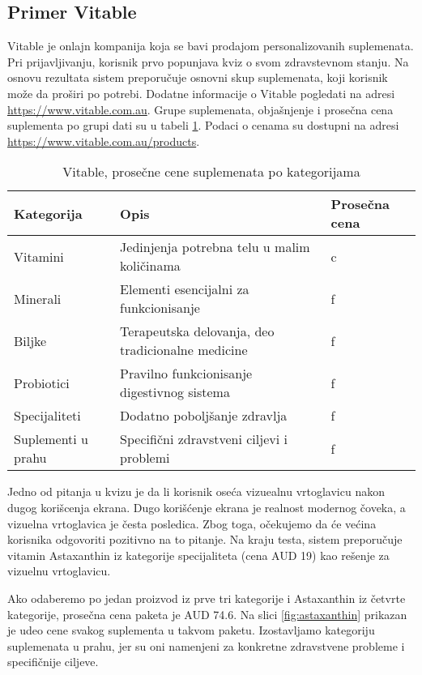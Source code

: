 \documentclass[a4paper]{article}
\begin{document}
\subsection{Primer Vitable}
Vitable je onlajn kompanija koja se bavi prodajom personalizovanih suplemenata. Pri prijavljivanju, korisnik prvo popunjava kviz o svom zdravstevnom stanju. Na osnovu rezultata sistem preporučuje osnovni skup suplemenata, koji korisnik može da proširi po potrebi. Dodatne informacije o Vitable pogledati na adresi \url{https://www.vitable.com.au}.
Grupe suplemenata, objašnjenje i prosečna cena suplementa po grupi dati su u tabeli \ref{tab:vitablecene}. Podaci o cenama su dostupni na adresi \url{https://www.vitable.com.au/products}.

\begin{table}[h!]
\small
\caption{Vitable, prosečne cene suplemenata po kategorijama}
\begin{tabular}{|l|l|l|} \hline
Kategorija& Opis & Prosečna cena\\ \hline
Vitamini &Jedinjenja potrebna telu u malim količinama&c\\ 
Minerali&Elementi esencijalni za funkcionisanje&f\\ 
Biljke&Terapeutska delovanja, deo tradicionalne medicine&f\\ 
Probiotici&Pravilno funkcionisanje digestivnog sistema&f\\ 
Specijaliteti&Dodatno poboljšanje zdravlja&f\\ 
Suplementi u prahu&Specifični zdravstveni ciljevi i problemi&f\\ \hline
\end{tabular}
\label{tab:vitablecene}
\end{table}


 Jedno od pitanja u kvizu je da li korisnik oseća vizuealnu vrtoglavicu nakon dugog korišcenja ekrana. Dugo korišćenje ekrana je realnost modernog čoveka, a vizuelna vrtoglavica je česta posledica. Zbog toga, očekujemo da će većina korisnika odgovoriti pozitivno na to pitanje. Na kraju testa, sistem preporučuje vitamin Astaxanthin iz kategorije specijaliteta (cena AUD 19) kao rešenje za vizuelnu vrtoglavicu. 

Ako odaberemo po jedan proizvod iz prve tri kategorije i Astaxanthin iz četvrte kategorije, prosečna cena paketa je AUD 74.6. Na slici \ref{fig:astaxanthin} prikazan je udeo cene svakog suplementa u takvom paketu. Izostavljamo kategoriju suplemenata u prahu, jer su oni namenjeni za konkretne zdravstvene probleme i specifičnije ciljeve. 
\end{document}
